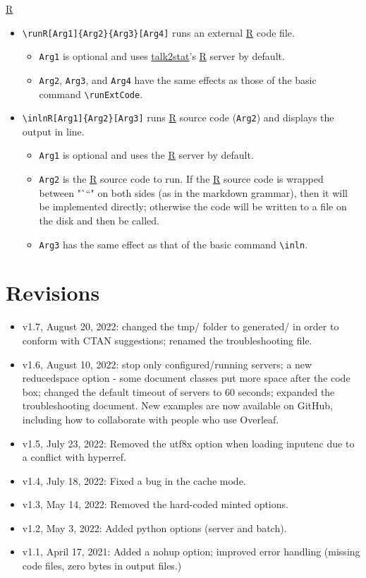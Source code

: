 \documentclass{ltxdoc}
\begin{document}
\href{https://www.r-project.org/}{R}

\begin{itemize}
\item \texttt{\textbackslash{}runR[Arg1]\{Arg2\}\{Arg3\}[Arg4]} runs an external
\href{https://www.r-project.org/}{R} code file.
\begin{itemize}
\item \texttt{Arg1} is optional and uses
\href{https://pypi.org/project/talk2stat/}{talk2stat}'s
\href{https://www.r-project.org/}{R} server by default.
\item \texttt{Arg2}, \texttt{Arg3}, and \texttt{Arg4} have the same effects as those of the
basic command \texttt{\textbackslash{}runExtCode}.
\end{itemize}
\item \texttt{\textbackslash{}inlnR[Arg1]\{Arg2\}[Arg3]} runs \href{https://www.r-project.org/}{R}
source code (\texttt{Arg2}) and displays the output in line.
\begin{itemize}
\item \texttt{Arg1} is optional and uses the \href{https://www.r-project.org/}{R}
server by default.
\item \texttt{Arg2} is the \href{https://www.r-project.org/}{R} source code to run.
If the \href{https://www.r-project.org/}{R} source code is wrapped
between "```" on both sides (as in the markdown grammar), then it
will be implemented directly; otherwise the code will be written to
a file on the disk and then be called.
\item \texttt{Arg3} has the same effect as that of the basic command \texttt{\textbackslash{}inln}.
\end{itemize}
\end{itemize}


\section{Revisions}
\label{sec:orgf446497}
\begin{itemize}
\item v1.7, August 20, 2022: changed the tmp/ folder to generated/ in order to
conform with CTAN suggestions; renamed the troubleshooting file.
\item v1.6, August 10, 2022: stop only configured/running servers; a new
reducedspace option - some document classes put more space after the code box;
changed the default timeout of servers to 60 seconds; expanded the
troubleshooting document. New examples are now available on GitHub, including
how to collaborate with people who use Overleaf.
\item v1.5, July 23, 2022: Removed the utf8x option when loading inputenc due to a
conflict with hyperref.
\item v1.4, July 18, 2022: Fixed a bug in the cache mode.
\item v1.3, May 14, 2022: Removed the hard-coded minted options.
\item v1.2, May 3, 2022: Added python options (server and batch).
\item v1.1, April 17, 2021: Added a nohup option; improved error handling (missing
code files, zero bytes in output files.)
\end{itemize}
\end{document}
